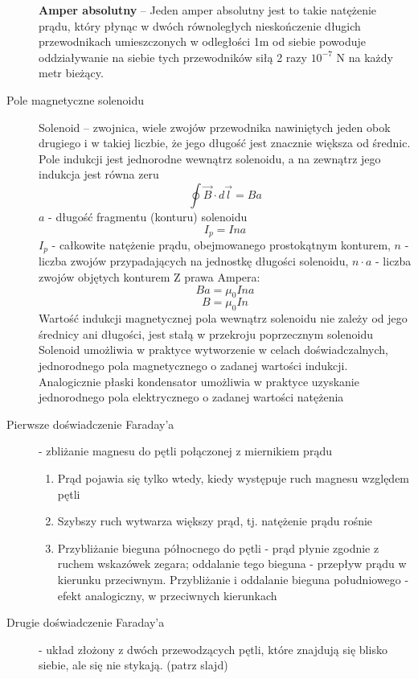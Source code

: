 \documentclass[a4paper,11pt]{article}
\begin{document}
\begin{description}
  \textbf{Amper absolutny} -- 
  Jeden amper absolutny jest to takie natężenie prądu, który płynąc w dwóch równoległych nieskończenie długich przewodnikach umieszczonych w odległości 1m od siebie powoduje oddziaływanie na siebie tych przewodników siłą 2 razy $10^{-7}$ N na każdy metr bieżący. 
\item[Pole magnetyczne solenoidu]

  Solenoid -- zwojnica, wiele zwojów przewodnika nawiniętych jeden obok drugiego i w takiej liczbie, że jego długość jest znacznie większa od średnic.\\
  Pole indukcji jest jednorodne wewnątrz solenoidu, a na zewnątrz jego indukcja jest równa zeru
  $$\oint\vec{B}\cdot d\vec{l}=Ba$$
  $a$ - długość fragmentu (konturu) solenoidu 
  $$I_p = Ina$$
  $I_p$ - całkowite natężenie prądu, obejmowanego prostokątnym konturem, $n$ - liczba zwojów przypadających na jednostkę długości solenoidu, $n\cdot a$ - liczba zwojów objętych konturem
  Z prawa Ampera:
  $$Ba=\mu_0Ina$$
  $$B = \mu_0 In$$
  Wartość indukcji magnetycznej pola wewnątrz solenoidu nie zależy od jego średnicy ani długości, jest stałą w przekroju poprzecznym solenoidu\\
  Solenoid umożliwia w praktyce wytworzenie w celach doświadczalnych, jednorodnego pola magnetycznego o zadanej wartości indukcji.\\
  Analogicznie płaski kondensator umożliwia w praktyce uzyskanie jednorodnego pola elektrycznego o zadanej wartości natężenia
\item[Pierwsze doświadczenie Faraday'a] - zbliżanie magnesu do pętli połączonej z miernikiem prądu
  \begin{enumerate}
  \item Prąd pojawia się tylko wtedy, kiedy występuje ruch magnesu względem pętli
  \item Szybszy ruch wytwarza większy prąd, tj. natężenie prądu rośnie
  \item Przybliżanie bieguna północnego do pętli - prąd płynie zgodnie z ruchem wskazówek zegara; oddalanie tego bieguna - przepływ prądu w kierunku przeciwnym. Przybliżanie i oddalanie bieguna południowego - efekt analogiczny, w przeciwnych kierunkach
  \end{enumerate}
\item[Drugie doświadczenie Faraday'a] - układ złożony z dwóch przewodzących pętli, które znajdują się blisko siebie, ale się nie stykają. (patrz slajd)


\end{description}
\end{document}
